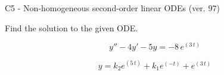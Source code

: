 \begin{exercise}
  \begin{exerciseTitle}C5 - Non-homogeneous second-order linear ODEs (ver. 97)\end{exerciseTitle}
  \begin{exerciseStatement}
    
Find the solution to the given ODE.

    
\[y''-4y'-5y = -8 \, e^{\left(3 \, t\right)}\]

  \end{exerciseStatement}
  \begin{exerciseAnswer}
    
\[y= k_{2} e^{\left(5 \, t\right)} + k_{1} e^{\left(-t\right)} + e^{\left(3 \, t\right)}\]

  \end{exerciseAnswer}
\end{exercise}